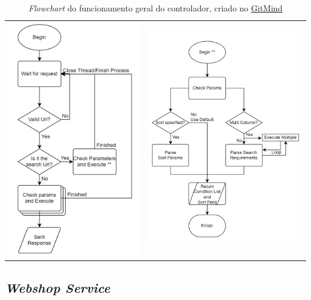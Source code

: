 \begin{table}[!hbt]
  \centering
  \begin{tabular}{ll}
    \includegraphics[width=6cm]{figuras/flowchart2.png}
    \label{fig:flow2} &
    \includegraphics[width=7cm]{figuras/flowchart3.png}
    \label{fig:flow3}   \\
  \end{tabular}
  \caption{\textit{Flowchart} do funcionamento geral do controlador, criado no \href{https://gitmind.com/app/flowchart/8d511739737}{GitMind}}
\end{table}
\FloatBarrier

\newpage

\subsection{\textit{Webshop Service}}

